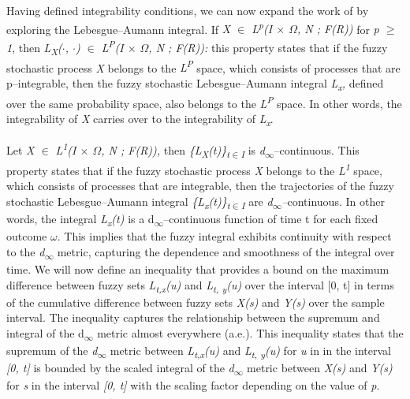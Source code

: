 \documentclass[12pt,a4paper]{report}
\numberwithin{equation}{section}
\begin{document}
Having defined integrability conditions, we can now expand the work of
\cite{jafari2021fuzzy_81} by exploring the Lebesgue--Aumann integral. If \emph{X $\in$
L\textsuperscript{p}(I $\times$ $\Omega$, N ; F(R))} for \emph{p $\geq$ 1}, then
\emph{L\textsubscript{X}($\cdot$, $\cdot$) $\in$ L\textsuperscript{P}(I $\times$ $\Omega$, N ; F(R)):}
this property states that if the fuzzy stochastic process \emph{X}
belongs to the \emph{L\textsuperscript{P}} space, which consists of
processes that are p--integrable, then the fuzzy stochastic
Lebesgue--Aumann integral \emph{L\textsubscript{x},} defined over the
same probability space, also belongs to the \emph{L\textsuperscript{P}}
space. In other words, the integrability of \emph{X} carries over to the
integrability of \emph{L\textsubscript{x}}.

Let \emph{X $\in$ L\textsuperscript{1}(I $\times$ $\Omega$, N ; F(R)),} then
\emph{\{L\textsubscript{X}(t)\}\textsubscript{t$\in$I}} is
\emph{d\textsubscript{$\infty$}}--continuous. This property states that if the
fuzzy stochastic process \emph{X} belongs to the
\emph{L\textsuperscript{1}} space, which consists of processes that are
integrable, then the trajectories of the fuzzy stochastic
Lebesgue--Aumann integral
\emph{\{L\textsubscript{x}(t)\}\textsubscript{t$\in$I}} are
\emph{d\textsubscript{$\infty$}--}continuous. In other words, the integral
\emph{L\textsubscript{x}(t)} is a d\textsubscript{$\infty$}--continuous function
of time t for each fixed outcome \emph{$\omega$}. This implies that the fuzzy
integral exhibits continuity with respect to the
\emph{d\textsubscript{$\infty$}} metric, capturing the dependence and
smoothness of the integral over time. We will now define an inequality
that provides a bound on the maximum difference between fuzzy sets
\emph{L\textsubscript{t,x}(u)} and \emph{L\textsubscript{t, y}(u)} over
the interval {[}0, t{]} in terms of the cumulative difference between
fuzzy sets \emph{X(s)} and \emph{Y(s)} over the sample interval. The
inequality captures the relationship between the supremum and integral
of the d\textsubscript{$\infty$} metric almost everywhere (a.e.). This
inequality states that the supremum of the \emph{d\textsubscript{$\infty$}}
metric between \emph{L\textsubscript{t,x}(u)} and
\emph{L\textsubscript{t, y}(u)} for \emph{u} in in the interval
\emph{{[}0, t{]}} is bounded by the scaled integral of the
\emph{d\textsubscript{$\infty$}} metric between \emph{X(s)} and \emph{Y(s)} for
\emph{s} in the interval \emph{{[}0, t{]}} with the scaling factor
depending on the value of \emph{p}.
\end{document}
